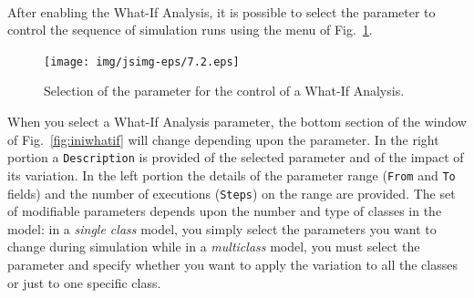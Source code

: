 \\ After enabling
the What-If Analysis, it is possible to select the parameter to
control the sequence of simulation runs using the menu of
Fig.~\ref{fig:selparwhatif}.
\begin{figure}[hbt]
    \begin{center}
        \texttt{[image: img/jsimg-eps/7.2.eps]}
    \end{center}
    \caption{Selection of the parameter for the control
    of a What-If Analysis.}
    \label{fig:selparwhatif}
\end{figure}
When you select a What-If Analysis parameter, the bottom section
of the window of Fig.~\ref{fig:iniwhatif} will change depending
upon the parameter. In the right portion a \texttt{Description} is
provided of the selected parameter and of the impact of its
variation. In the left portion the details of the parameter range
(\texttt{From} and \texttt{To} fields) and the number of
executions (\texttt{Steps}) on the range are provided. The set of
modifiable parameters depends upon the number and type of classes
in the model: in a \emph{single class} model, you simply select
the parameters you want to change during simulation while in a
\emph{multiclass} model, you must select the parameter and specify
whether you want to apply the variation to all the classes or just
to one specific class.\\

